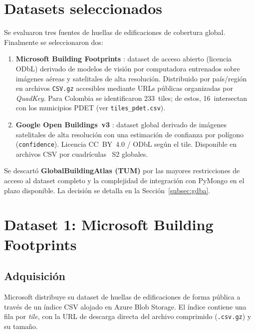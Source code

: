 \documentclass[12pt, a4paper]{report}
\begin{document}
\section{Datasets seleccionados}

Se evaluaron tres fuentes de huellas de edificaciones de cobertura
global. Finalmente se seleccionaron dos:

\begin{enumerate}
  \item \textbf{Microsoft Building Footprints}
    \parencite{microsoft2023buildings}: dataset de acceso abierto
    (licencia ODbL) derivado de modelos de visión por computadora
    entrenados sobre imágenes aéreas y satelitales de alta resolución.
    Distribuido por país/región en archivos \texttt{CSV.gz} accesibles
    mediante URLs públicas organizadas por \textit{QuadKey}.
    Para Colombia se identificaron 233~tiles; de estos, 16~intersectan
    con los municipios PDET (ver \texttt{tiles\_pdet.csv}).

  \item \textbf{Google Open Buildings~v3}
    \parencite{sirko2021continental}: dataset global derivado de imágenes
    satelitales de alta resolución con una estimación de confianza por
    polígono (\texttt{confidence}). Licencia CC~BY~4.0 / ODbL según el
    tile. Disponible en archivos CSV por cuadrículas ~S2 globales.
\end{enumerate}

Se descartó \textbf{GlobalBuildingAtlas (TUM)} por las mayores
restricciones de acceso al dataset completo y la complejidad de integración
con PyMongo en el plazo disponible. La decisión se detalla en la
Sección~\ref{subsec:gdba}.

\section{Dataset 1: Microsoft Building Footprints}

\subsection{Adquisición}
\label{subsec:ms_adquisicion}

Microsoft distribuye su dataset de huellas de edificaciones de forma pública
a través de un índice CSV alojado en Azure Blob Storage. El índice contiene
una fila por \textit{tile}, con la URL de descarga directa del archivo
comprimido (\texttt{.csv.gz}) y su tamaño.
\end{document}

